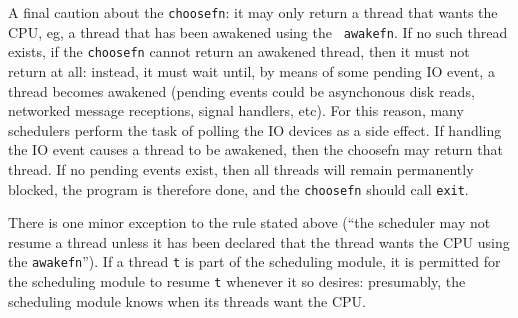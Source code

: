 
A final caution about the {\tt choosefn}: it may only return a thread
that wants the CPU, eg, a thread that has been awakened using the {\tt
awakefn}.  If no such thread exists, if the {\tt choosefn} cannot
return an awakened thread, then it must not return at all: instead, it
must wait until, by means of some pending IO event, a thread becomes
awakened (pending events could be asynchonous disk reads, networked
message receptions, signal handlers, etc).  For this reason, many
schedulers perform the task of polling the IO devices as a side
effect.  If handling the IO event causes a thread to be awakened, then
the choosefn may return that thread.  If no pending events exist, then
all threads will remain permanently blocked, the program is therefore
done, and the {\tt choosefn} should call {\tt exit}.

There is one minor exception to the rule stated above (``the scheduler
may not resume a thread unless it has been declared that the thread
wants the CPU using the {\tt awakefn}'').  If a thread {\tt t} is part
of the scheduling module, it is permitted for the scheduling module to
resume {\tt t} whenever it so desires: presumably, the scheduling
module knows when its threads want the CPU.

